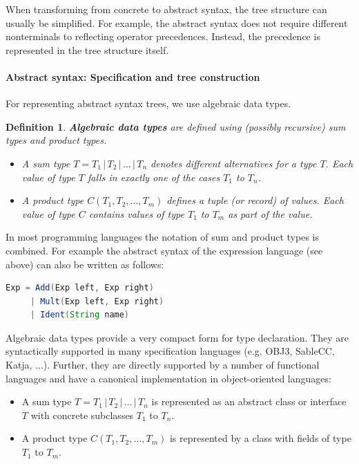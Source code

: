 \documentclass{scrartcl}
\newcommand{\term}[1]{\textbf{#1}}
\newtheorem{definition}{Definition}
\begin{document}
When transforming from concrete to abstract syntax, the tree structure can usually be simplified. For example, the abstract syntax does not require different nonterminals to reflecting operator precedences. Instead, the precedence is represented in the tree structure itself.

\paragraph{Abstract syntax: Specification and tree construction}
For representing abstract syntax trees, we use algebraic data types.

\begin{definition}
\term{Algebraic data types} are defined using (possibly recursive) sum types and product types.
\begin{itemize}
 \item A sum type $T = T_1 \,|\, T_2 \,|\, \dots \,|\, T_n$ denotes different alternatives for a type $T$.
    Each value of type $T$ falls in exactly one of the cases $T_1$ to $T_n$.

 \item A product type $C(T_1,T_2, \dots, T_m)$ defines a tuple (or record) of values.
    Each value of type $C$ contains values of type $T_1$ to $T_m$ as part of the value.
\end{itemize}
\end{definition}

In most programming languages the notation of sum and product types is combined.
For example the abstract syntax of the expression language (see above) can also be written as follows:

\begin{lstlisting}[language=Java,basicstyle=\scriptsize\ttfamily]
 Exp = Add(Exp left, Exp right)
     | Mult(Exp left, Exp right)
     | Ident(String name)
\end{lstlisting}

Algebraic data types provide a very compact form for type declaration.
They are syntactically supported in many specification languages (e.g. OBJ3, SableCC, Katja, ...).
Further, they are directly supported by a number of functional languages and have a canonical implementation in object-oriented languages:

\begin{itemize}
 \item A sum type $T = T_1 \,|\, T_2 \,|\, \dots \,|\, T_n$ is represented as an abstract class or interface $T$ with concrete subclasses $T_1$ to $T_n$.
 \item A product type $C(T_1,T_2, \dots, T_m)$ is represented by a class with fields of type $T_1$ to $T_m$.
\end{itemize}
\end{document}
